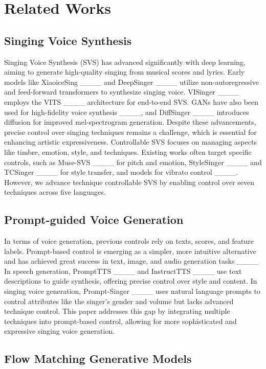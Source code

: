 \section{Related Works}
\subsection{Singing Voice Synthesis}

Singing Voice Synthesis (SVS) has advanced significantly with deep learning, aiming to generate high-quality singing from musical scores and lyrics. Early models like XiaoiceSing ____ and DeepSinger ____ utilize non-autoregressive and feed-forward transformers to synthesize singing voice. VISinger ____ employs the VITS ____ architecture for end-to-end SVS. GANs have also been used for high-fidelity voice synthesis ____, and DiffSinger ____ introduces diffusion for improved mel-spectrogram generation.
Despite these advancements, precise control over singing techniques remains a challenge, which is essential for enhancing artistic expressiveness. Controllable SVS focuses on managing aspects like timbre, emotion, style, and techniques. Existing works often target specific controls, such as Muse-SVS ____ for pitch and emotion, StyleSinger ____ and TCSinger ____ for style transfer, and models for vibrato control ____. However, we advance technique controllable SVS by enabling control over seven techniques across five languages.

\subsection{Prompt-guided Voice Generation}
In terms of voice generation, previous controls rely on texts, scores, and feature labels. Prompt-based control is emerging as a simpler, more intuitive alternative and has achieved great success in text, image, and audio generation tasks ____
In speech generation, PromptTTS ____ and InstructTTS ____ use text descriptions to guide synthesis, offering precise control over style and content.
In singing voice generation, Prompt-Singer ____ uses natural language prompts to control attributes like the singer's gender and volume but lacks advanced technique control. This paper addresses this gap by integrating multiple techniques into prompt-based control, allowing for more sophisticated and expressive singing voice generation.

\subsection{Flow Matching Generative Models}

